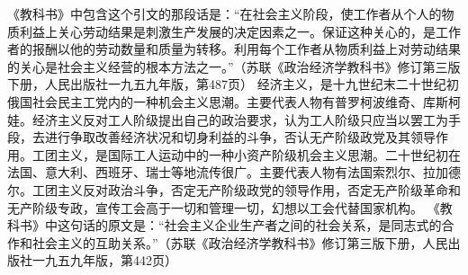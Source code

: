 \begin{maonote}
《教科书》中包含这个引文的那段话是：“在社会主义阶段，使工作者从个人的物质利益上关心劳动结果是刺激生产发展的决定因素之一。保证这种关心的，是工作者的报酬以他的劳动数量和质量为转移。利用每个工作者从物质利益上对劳动结果的关心是社会主义经营的根本方法之一。”（苏联《政治经济学教科书》修订第三版下册，人民出版社一九五九年版，第487页）
经济主义，是十九世纪末二十世纪初俄国社会民主工党内的一种机会主义思潮。主要代表人物有普罗柯波维奇、库斯柯娃。经济主义反对工人阶级提出自己的政治要求，认为工人阶级只应当以罢工为手段，去进行争取改善经济状况和切身利益的斗争，否认无产阶级政党及其领导作用。工团主义，是国际工人运动中的一种小资产阶级机会主义思潮。二十世纪初在法国、意大利、西班牙、瑞士等地流传很广。主要代表人物有法国索烈尔、拉加德尔。工团主义反对政治斗争，否定无产阶级政党的领导作用，否定无产阶级革命和无产阶级专政，宣传工会高于一切和管理一切，幻想以工会代替国家机构。
《教科书》中这句话的原文是：“社会主义企业生产者之间的社会关系，是同志式的合作和社会主义的互助关系。”（苏联《政治经济学教科书》修订第三版下册，人民出版社一九五九年版，第442页）
\end{maonote}
